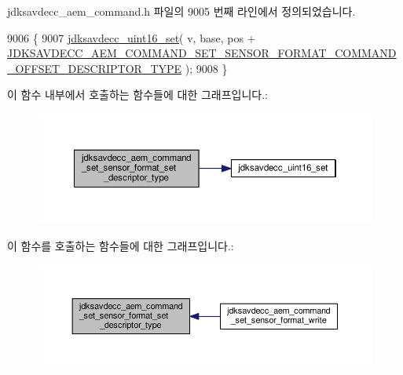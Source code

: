 jdksavdecc\+\_\+aem\+\_\+command.\+h 파일의 9005 번째 라인에서 정의되었습니다.


\begin{DoxyCode}
9006 \{
9007     \hyperlink{group__endian_ga14b9eeadc05f94334096c127c955a60b}{jdksavdecc\_uint16\_set}( v, base, pos + 
      \hyperlink{group__command__set__sensor__format_gace515c24588c3ae825ba2d012e5b4257}{JDKSAVDECC\_AEM\_COMMAND\_SET\_SENSOR\_FORMAT\_COMMAND\_OFFSET\_DESCRIPTOR\_TYPE}
       );
9008 \}
\end{DoxyCode}


이 함수 내부에서 호출하는 함수들에 대한 그래프입니다.\+:
\nopagebreak
\begin{figure}[H]
\begin{center}
\leavevmode
\includegraphics[width=350pt]{group__command__set__sensor__format_gae2e51e2c0aa70fca0f5eef87baf9f94b_cgraph}
\end{center}
\end{figure}




이 함수를 호출하는 함수들에 대한 그래프입니다.\+:
\nopagebreak
\begin{figure}[H]
\begin{center}
\leavevmode
\includegraphics[width=350pt]{group__command__set__sensor__format_gae2e51e2c0aa70fca0f5eef87baf9f94b_icgraph}
\end{center}
\end{figure}


